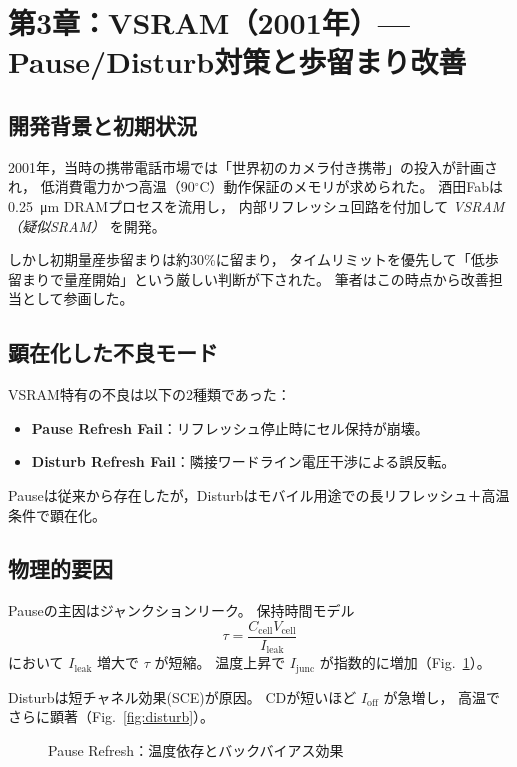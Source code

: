 \documentclass[conference]{IEEEtran}
\begin{document}
\section{第3章：VSRAM（2001年）— Pause/Disturb対策と歩留まり改善}

\subsection{開発背景と初期状況}
2001年，当時の携帯電話市場では「世界初のカメラ付き携帯」の投入が計画され，
低消費電力かつ高温（90$^\circ$C）動作保証のメモリが求められた。
酒田Fabは \SI{0.25}{\micro\meter} DRAMプロセスを流用し，
内部リフレッシュ回路を付加して \emph{VSRAM（疑似SRAM）} を開発。

しかし初期量産歩留まりは約30\%に留まり，
タイムリミットを優先して「低歩留まりで量産開始」という厳しい判断が下された。
筆者はこの時点から改善担当として参画した。

\subsection{顕在化した不良モード}
VSRAM特有の不良は以下の2種類であった：
\begin{itemize}
  \item \textbf{Pause Refresh Fail}：リフレッシュ停止時にセル保持が崩壊。
  \item \textbf{Disturb Refresh Fail}：隣接ワードライン電圧干渉による誤反転。
\end{itemize}

Pauseは従来から存在したが，Disturbはモバイル用途での長リフレッシュ＋高温条件で顕在化。

\subsection{物理的要因}
Pauseの主因はジャンクションリーク。
保持時間モデル
\[
\tau = \frac{C_{\mathrm{cell}} V_{\mathrm{cell}}}{I_{\mathrm{leak}}}
\]
において $I_{\mathrm{leak}}$ 増大で $\tau$ が短縮。
温度上昇で $I_{\mathrm{junc}}$ が指数的に増加（Fig.~\ref{fig:pause}）。

Disturbは短チャネル効果(SCE)が原因。
CDが短いほど $I_{\mathrm{off}}$ が急増し，
高温でさらに顕著（Fig.~\ref{fig:disturb}）。

\begin{figure}[t]
\centering
{}
\caption{Pause Refresh：温度依存とバックバイアス効果}
\label{fig:pause}
\end{figure}
\end{document}
